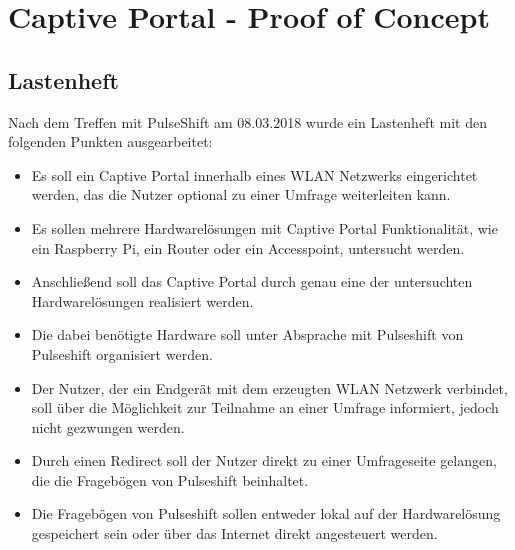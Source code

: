 \section{Captive Portal - Proof of Concept}
\label{section:realisation:captive_portal}
\subsection{Lastenheft}
Nach dem Treffen mit PulseShift am 08.03.2018 wurde ein Lastenheft mit den folgenden Punkten ausgearbeitet:
\begin{itemize}
\item Es soll ein Captive Portal innerhalb eines WLAN Netzwerks eingerichtet werden, das die Nutzer optional zu einer Umfrage weiterleiten kann.
\item Es sollen mehrere Hardwarelösungen mit Captive Portal Funktionalität, wie ein Raspberry Pi, ein Router oder ein Accesspoint, untersucht werden. 
\item Anschließend soll das Captive Portal durch genau eine der untersuchten Hardwarelösungen realisiert werden.
\item Die dabei benötigte Hardware soll unter Absprache mit Pulseshift von Pulseshift organisiert werden.
\item Der Nutzer, der ein Endgerät mit dem erzeugten WLAN Netzwerk verbindet, soll über die Möglichkeit zur Teilnahme an einer Umfrage informiert, jedoch nicht gezwungen werden.
\item Durch einen Redirect soll der Nutzer direkt zu einer Umfrageseite gelangen, die die Fragebögen von Pulseshift beinhaltet.
\item Die Fragebögen von Pulseshift sollen entweder lokal auf der Hardwarelösung gespeichert sein oder über das Internet direkt angesteuert werden.
\end{itemize}

